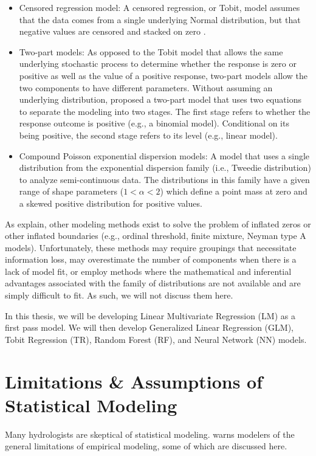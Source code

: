 \begin{itemize}
	\item Censored regression model: A censored regression, or Tobit, model assumes that the data comes from a single underlying Normal distribution, but that negative values are censored and stacked on zero \cite{tobin1958estimation}.
	\item Two-part models: As opposed to the Tobit model that allows the same underlying stochastic process to determine whether the response is zero or positive as well as the value of a positive response, two-part models allow the two components to have different parameters. Without assuming an underlying distribution,   proposed a two-part model that uses two equations to separate the modeling into two stages. The first stage refers to whether the response outcome is positive (e.g., a binomial model). Conditional on its being positive, the second stage refers to its level (e.g., linear model).
	\item Compound Poisson exponential dispersion models: A model that uses a single distribution from the exponential dispersion family (i.e., Tweedie distribution) to analyze semi-continuous data. The distributions in this family have a given range of shape parameters ($1<\alpha<2$) which define a point mass at zero and a skewed positive distribution for positive values. 
\end{itemize}

As  explain, other modeling methods exist to solve the problem of inflated zeros or other inflated boundaries (e.g., ordinal threshold, finite mixture, Neyman type A models). Unfortunately, these methods may require groupings that necessitate information loss, may overestimate the number of components when there is a lack of model fit, or employ methods where the mathematical and inferential advantages associated with the family of distributions are not available and are simply difficult to fit. As such, we will not discuss them here. 

In this thesis, we will be developing Linear Multivariate Regression (LM) as a first pass model. We will then develop Generalized Linear Regression (GLM), Tobit Regression (TR), Random Forest (RF), and Neural Network (NN) models. 

\section{Limitations \& Assumptions of Statistical Modeling}
Many hydrologists are skeptical of statistical modeling.  warns modelers of the general limitations of empirical modeling, some of which are discussed here.

